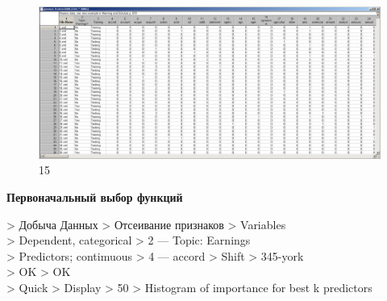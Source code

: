\begin{figure}[!h]
  \centering

  \includegraphics[width=17cm]
  {inc/15.PNG}

  \caption{15}

  \label{fig:15}
\end{figure}

\newpage

\begin{center}
  \textbf{Первоначальный выбор функций}
\end{center}

> Добыча Данных > Отсеивание признаков > Variables \\
> Dependent, categorical > 2 — Topic: Earnings \\
> Predictors; contimuous > 4 — accord > Shift > 345-york \\
> OK > OK \\
> Quick > Display > 50 > Histogram of importance for best k predictors \\

